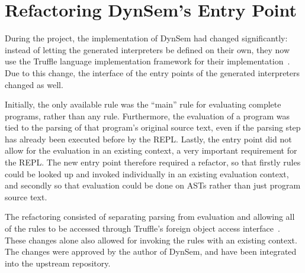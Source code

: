 \section{Refactoring DynSem's Entry Point}
\label{sec:dynsem-refactor}
During the project, the implementation of DynSem had changed significantly:
instead of letting the generated interpreters be defined on their own, they now
use the Truffle language implementation framework for their
implementation~\cite{Humer14}. Due to this change, the interface of the entry
points of the generated interpreters changed as well.

Initially, the only available rule was the ``main'' rule for evaluating complete
programs, rather than any rule. Furthermore, the evaluation of a program was
tied to the parsing of that program's original source text, even if the parsing
step has already been executed before by the REPL. Lastly, the entry point did
not allow for the evaluation in an existing context, a very important
requirement for the REPL. The new entry point therefore required a refactor, so
that firstly rules could be looked up and invoked individually in an existing
evaluation context, and secondly so that evaluation could be done on ASTs rather
than just program source text.

The refactoring consisted of separating parsing from evaluation and allowing all
of the rules to be accessed through Truffle's foreign object access
interface~\cite{Grimmer15}. These changes alone also allowed for invoking the
rules with an existing context. The changes were approved by the author of
DynSem, and have been integrated into the upstream repository.

